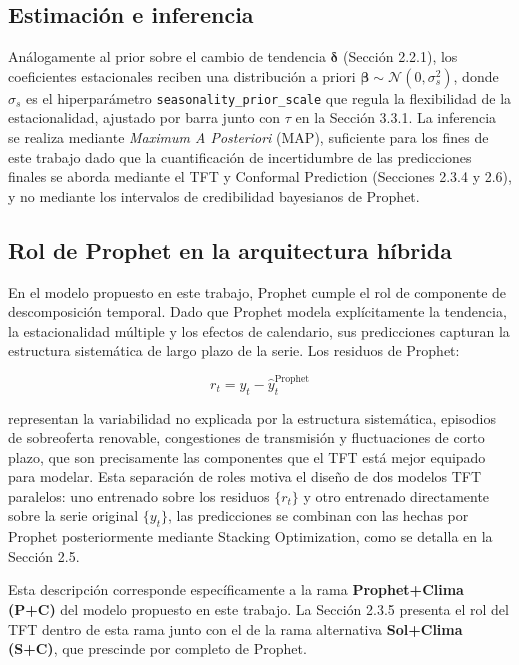 \subsection{Estimación e inferencia}

Análogamente al prior sobre el cambio de tendencia $\boldsymbol{\delta}$ (Sección 2.2.1), los coeficientes estacionales reciben una distribución a priori $\boldsymbol{\beta} \sim \mathcal{N}(0, \sigma_s^2)$, donde $\sigma_s$ es el hiperparámetro \texttt{seasonality\_prior\_scale} que regula la flexibilidad de la estacionalidad, ajustado por barra junto con $\tau$ en la Sección 3.3.1. La inferencia se realiza mediante \textit{Maximum A Posteriori} (MAP), suficiente para los fines de este trabajo dado que la cuantificación de incertidumbre de las predicciones finales se aborda mediante el TFT y Conformal Prediction (Secciones 2.3.4 y 2.6), y no mediante los intervalos de credibilidad bayesianos de Prophet.

\subsection{Rol de Prophet en la arquitectura híbrida}

En el modelo propuesto en este trabajo, Prophet cumple el rol de componente de descomposición temporal. Dado que Prophet modela explícitamente la tendencia, la estacionalidad múltiple y los efectos de calendario, sus predicciones capturan la estructura sistemática de largo plazo de la serie. Los residuos de Prophet:

\begin{equation}
r_t = y_t - \hat{y}_t^{\text{Prophet}}
\end{equation}

representan la variabilidad no explicada por la estructura sistemática, episodios de sobreoferta renovable, congestiones de transmisión y fluctuaciones de corto plazo, que son precisamente las componentes que el TFT está mejor equipado para modelar. Esta separación de roles motiva el diseño de dos modelos TFT paralelos: uno entrenado sobre los residuos $\{r_t\}$ y otro entrenado directamente sobre la serie original $\{y_t\}$, las predicciones se combinan con las hechas por Prophet posteriormente mediante Stacking Optimization, como se detalla en la Sección 2.5.

Esta descripción corresponde específicamente a la rama \textbf{Prophet+Clima (P+C)} del modelo propuesto en este trabajo. La Sección 2.3.5 presenta el rol del TFT dentro de esta rama junto con el de la rama alternativa \textbf{Sol+Clima (S+C)}, que prescinde por completo de Prophet.

